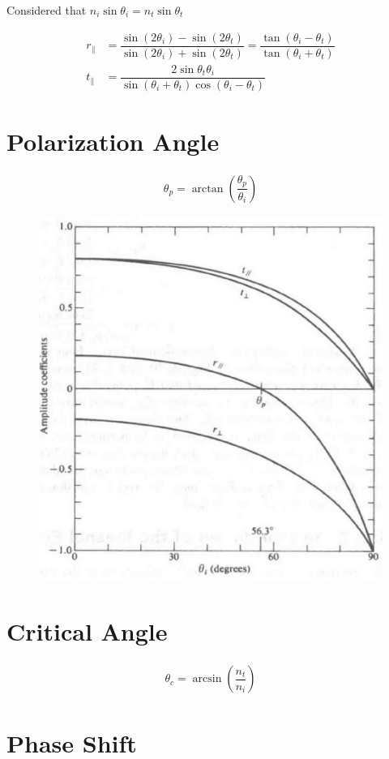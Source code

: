 Considered that $n_i \sin \theta_i = n_t \sin \theta_t$

\begin{equation*}
  \begin{aligned}
    r_{\parallel} &= \dfrac{\sin \left( 2 \theta_i \right) - \sin \left( 2 \theta_t \right)}{\sin \left( 2 \theta_i \right) + \sin \left( 2 \theta_t \right)} = \dfrac{\tan \left( \theta_i - \theta_t \right)}{\tan \left( \theta_i + \theta_t \right)} \\
    t_{\parallel} &= \dfrac{2 \sin \theta_t \theta_i}{\sin \left( \theta_i + \theta_t \right) \cos \left( \theta_i - \theta_t \right)} 
  \end{aligned}
\end{equation*}

\section{Polarization Angle}

\begin{equation*}
  \begin{aligned}
    \theta_p = \arctan \left( \dfrac{\theta_p}{\theta_i}  \right)
  \end{aligned}
\end{equation*}

\begin{figure}[H]
  \centering
  \includegraphics[width=0.3\linewidth]{figures/Polarization-angle}
  \label{fig:}
\end{figure}

\section{Critical Angle}

\begin{equation*}
  \begin{aligned}
    \theta_c = \arcsin \left( \dfrac{n_t}{n_i}  \right)
  \end{aligned}
\end{equation*}

\section{Phase Shift}

